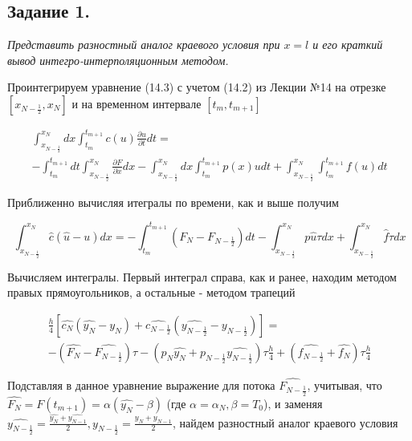 \documentclass[a4paper,12pt]{article}
\begin{document}
	\subsection*{Задание 1.}
	
	\textit{Представить разностный аналог краевого условия при $x = l$ и его краткий вывод интегро-интерполяционным методом.}
	
	Проинтегрируем уравнение (14.3) с учетом (14.2) из Лекции №14 на отрезке $[x_{N-\frac{1}{2}}, x_N]$ и на временном интервале $[t_m, t_{m+1}]$
	
	\begin{eqnarray} \int_{x_{N-\frac{1}{2}}}^{x_N}dx\int_{t_m}^{t_{m+1}}c(u)\frac{\partial u}{\partial t}dt = \nonumber \\ -\int_{t_m}^{t_{m+1}}dt\int_{x_{N-\frac{1}{2}}}^{x_N}\frac{\partial F}{\partial x}dx-\int_{x_{N-\frac{1}{2}}}^{x_N}dx\int_{t_m}^{t_{m+1}}p(x)u dt+\int_{x_{N-\frac{1}{2}}}^{x_N}\int_{t_m}^{t_{m+1}}f(u)dt \nonumber
	\end{eqnarray}
	
	Приближенно вычисляя итегралы по времени, как и выше получим
	
	\[\int_{x_{N-\frac{1}{2}}}^{x_N}\widehat{c}(\widehat{u}-u)dx = 
	-\int_{t_m}^{t_{m+1}}(F_N-F_{N-\frac{1}{2}})dt-\int_{x_{N-\frac{1}{2}}}^{x_N}p\widehat{u}\tau dx + \int_{x_{N-\frac{1}{2}}}^{x_N}\widehat{f}\tau dx\]
	
	Вычисляем интегралы. Первый интеграл справа, как и ранее, находим методом
	правых прямоугольников, а остальные - методом трапеций
	
	\begin{eqnarray}
	\frac{h}{4}\left[\widehat{c_N}(\widehat{y_N}-y_N)+\widehat{c_{N-\frac{1}{2}}}(\widehat{y_{N-\frac{1}{2}}} - y_{N-\frac{1}{2}}) \right] = \nonumber \\ -(\widehat{F_N} - \widehat{F_{N - \frac{1}{2}}})\tau - (p_N\widehat{y_N} + p_{N-\frac{1}{2}}\widehat{y_{N-\frac{1}{2}}})\tau \frac{h}{4} + (\widehat{f_{N - \frac{1}{2}}} + \widehat{f_N})\tau \frac{h}{4} \nonumber
	\end{eqnarray}
	
	Подставляя в данное уравнение выражение для потока $\widehat{F_{N - \frac{1}{2}}}$, учитывая, что $\widehat{F_N} = F(t_{m + 1}) = \alpha (\widehat{y_N} - \beta)$ (где $\alpha = \alpha_N, \beta = T_0$), и заменяя $\widehat{y_{N - \frac{1}{2}}} = \frac{\widehat{y_N} + \widehat{y_{N - 1}}}{2}, y_{N - \frac{1}{2}} = \frac{y_N + y_{N - 1}}{2}$, найдем разностный аналог краевого условия
	
\end{document}
